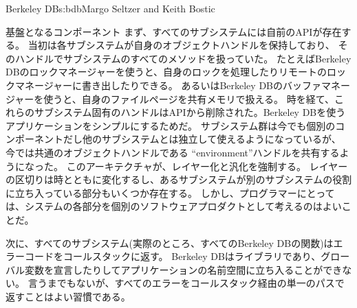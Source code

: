\begin{aosachapter}{Berkeley DB}{s:bdb}{Margo Seltzer and Keith Bostic}
\begin{aosasect1}{基盤となるコンポーネント}
まず、すべてのサブシステムには自前のAPIが存在する。
当初は各サブシステムが自身のオブジェクトハンドルを保持しており、
そのハンドルでサブシステムのすべてのメソッドを扱っていた。
たとえばBerkeley DBのロックマネージャーを使うと、自身のロックを処理したりリモートのロックマネージャーに書き出したりできる。
あるいはBerkeley DBのバッファマネージャーを使うと、自身のファイルページを共有メモリで扱える。
時を経て、これらのサブシステム固有のハンドルはAPIから削除された。Berkeley DBを使うアプリケーションをシンプルにするためだ。
サブシステム群は今でも個別のコンポーネントだし他のサブシステムとは独立して使えるようになっているが、
今では共通のオブジェクトハンドルである ``environment''ハンドルを共有するようになった。
このアーキテクチャが、レイヤー化と汎化を強制する。
レイヤーの区切りは時とともに変化するし、あるサブシステムが別のサブシステムの役割に立ち入っている部分もいくつか存在する。
しかし、プログラマーにとっては、システムの各部分を個別のソフトウェアプロダクトとして考えるのはよいことだ。

次に、すべてのサブシステム(実際のところ、すべてのBerkeley DBの関数)はエラーコードをコールスタックに返す。
Berkeley DBはライブラリであり、グローバル変数を宣言したりしてアプリケーションの名前空間に立ち入ることができない。
言うまでもないが、すべてのエラーをコールスタック経由の単一のパスで返すことはよい習慣である。


\end{aosasect1}
\end{aosachapter}
